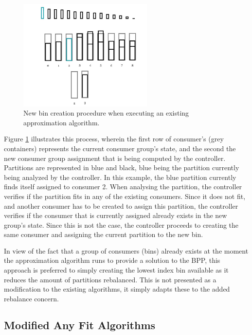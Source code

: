 \begin{figure}[H] 
\centering
\includegraphics[width=0.6\textwidth]{images/controller/ApproximationAlgorithm_NewBin.png}
\caption{
    New bin creation procedure when executing an existing approximation algorithm.
}
\label{fig:approximation_bin_creation} 
\end{figure}

Figure \ref{fig:approximation_bin_creation} illustrates this process, wherein
the first row of consumer's (grey containers) represents the current consumer
group's state, and the second the new consumer group assignment that is being
computed by the controller. Partitions are represented in blue and black, blue
being the partition currently being analyzed by the controller. In this example,
the blue partition currently finds itself assigned to consumer 2. When analysing
the partition, the controller verifies if the partition fits in any of the
existing consumers. Since it does not fit, and another consumer has to be
created to assign this partition, the controller verifies if the consumer that
is currently assigned already exists in the new group's state. Since this is not
the case, the controller proceeds to creating the same consumer and assigning
the current partition to the new bin.

In view of the fact that a group of consumers (bins) already exists at the
moment the approximation algorithm runs to provide a solution to the BPP, this
approach is preferred to simply creating the lowest index bin available as it
reduces the amount of partitions rebalanced. This is not presented as a
modification to the existing algorithms, it simply adapts these to the added
rebalance concern.

\subsection{Modified Any Fit Algorithms}
\label{subsub:modified_any_fit}

